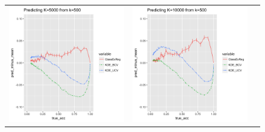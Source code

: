 \documentclass[twoside,11pt]{article}
\begin{document}
\begin{figure}[p]
\begin{tabular}{ccc}
\includegraphics[scale = 0.45, clip = true, trim = .3in 0 1.23in 0.4in]{sim_large7_biaz_K5_k0_5.png} &
\includegraphics[scale = 0.45, clip = true, trim = .3in 0 0.00in 0.4in]{sim_large7_biaz_K10_k0_5.png}\\

\end{tabular}
\end{figure}
\end{document}
